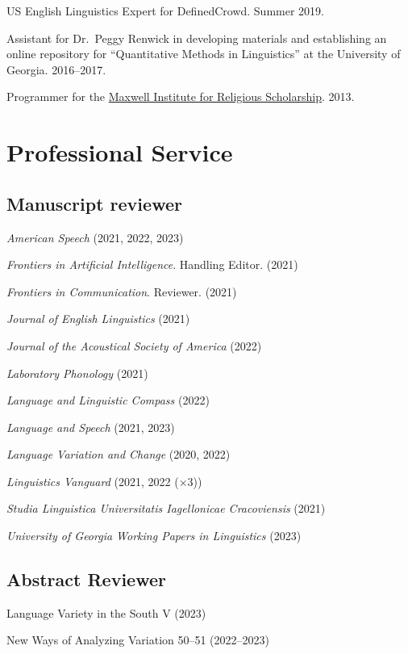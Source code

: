 \documentclass[
]{article}
\begin{document}
US English Linguistics Expert for DefinedCrowd. Summer 2019.

Assistant for Dr.~Peggy Renwick in developing materials and establishing
an online repository for ``Quantitative Methods in Linguistics'' at the
University of Georgia. 2016--2017.

Programmer for the \href{http://mi.byu.edu}{Maxwell Institute for
Religious Scholarship}. 2013.

\hypertarget{professional-service}{%
\section{Professional Service}\label{professional-service}}

\hypertarget{manuscript-reviewer}{%
\subsection{Manuscript reviewer}\label{manuscript-reviewer}}

\emph{American Speech} (2021, 2022, 2023)

\emph{Frontiers in Artificial Intelligence}. Handling Editor. (2021)

\emph{Frontiers in Communication}. Reviewer. (2021)

\emph{Journal of English Linguistics} (2021)

\emph{Journal of the Acoustical Society of America} (2022)

\emph{Laboratory Phonology} (2021)

\emph{Language and Linguistic Compass} (2022)

\emph{Language and Speech} (2021, 2023)

\emph{Language Variation and Change} (2020, 2022)

\emph{Linguistics Vanguard} (2021, 2022 (×3))

\emph{Studia Linguistica Universitatis Iagellonicae Cracoviensis} (2021)

\emph{University of Georgia Working Papers in Linguistics} (2023)

\hypertarget{abstract-reviewer}{%
\subsection{Abstract Reviewer}\label{abstract-reviewer}}

Language Variety in the South V (2023)

New Ways of Analyzing Variation 50--51 (2022--2023)
\end{document}
